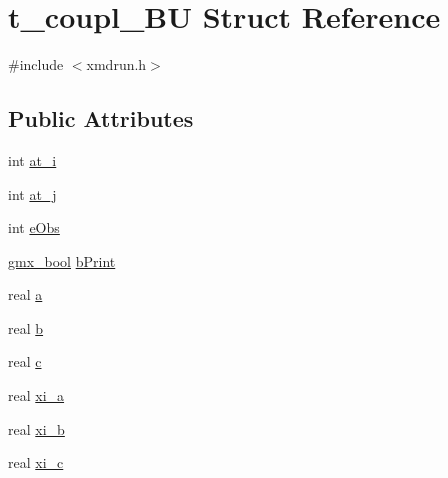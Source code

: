 \hypertarget{structt__coupl__BU}{\section{t\-\_\-coupl\-\_\-\-B\-U \-Struct \-Reference}
\label{structt__coupl__BU}
}


{\ttfamily \#include $<$xmdrun.\-h$>$}

\subsection*{\-Public \-Attributes}
\begin{DoxyCompactItemize}
\item 
int \hyperlink{structt__coupl__BU_a630243f67d4f24939785477616dbab01}{at\-\_\-i}
\item 
int \hyperlink{structt__coupl__BU_a7f6c6aab93f082bb48a4c94ffa558703}{at\-\_\-j}
\item 
int \hyperlink{structt__coupl__BU_a3daa083952d2b33069f31868fbe5874b}{e\-Obs}
\item 
\hyperlink{include_2types_2simple_8h_a8fddad319f226e856400d190198d5151}{gmx\-\_\-bool} \hyperlink{structt__coupl__BU_a3026345b2b418027e4660feb664adecc}{b\-Print}
\item 
real \hyperlink{structt__coupl__BU_a8e20720adcca4de40bc050730f6e4a41}{a}
\item 
real \hyperlink{structt__coupl__BU_ae7d5a86a3a3045955a71282c505d4b49}{b}
\item 
real \hyperlink{structt__coupl__BU_ad5cbddf8045b20e2e20262772d50d166}{c}
\item 
real \hyperlink{structt__coupl__BU_ac165fb76a43cdaab33e37870f53b2c1d}{xi\-\_\-a}
\item 
real \hyperlink{structt__coupl__BU_ac34a7d7d0ebfe5faf846ce437561a611}{xi\-\_\-b}
\item 
real \hyperlink{structt__coupl__BU_abcdc5d0cea8db7fa532c735592ef4895}{xi\-\_\-c}
\end{DoxyCompactItemize}


